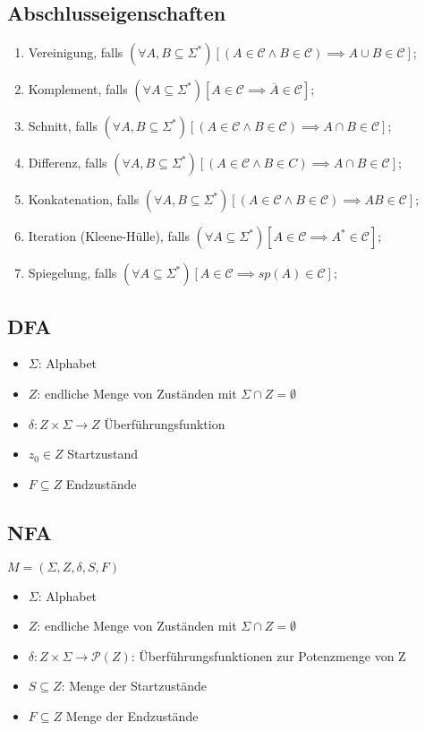 \documentclass[9pt, a4paper]{article}
\begin{document}
\subsection{Abschlusseigenschaften}
\begin{enumerate}
	\item Vereinigung, falls $(\forall A, B \subseteq \Sigma^*)[(A \in \mathcal{C} \wedge B \in \mathcal{ C}) \implies A \cup B \in \mathcal{C}]$;
	\item Komplement, falls $(\forall A \subseteq \Sigma^*)[A \in \mathcal{C} \implies \overline{A}\in\mathcal{C}]$;
	\item Schnitt, falls $(\forall A, B \subseteq \Sigma^*)[(A \in \mathcal{C} \wedge B \in \mathcal{C}) \implies A \cap B \in \mathcal{C}]$;
	\item Differenz, falls $(\forall A, B \subseteq \Sigma^*)[(A \in \mathcal{C} \wedge B \in C) \implies A \cap B \in \mathcal{C}]$;
	\item Konkatenation, falls $(\forall A, B \subseteq \Sigma^*)[(A \in \mathcal{C} \wedge B \in \mathcal{C})\implies AB \in \mathcal{C}]$;
	\item Iteration (Kleene-Hülle), falls $(\forall A \subseteq \Sigma^*)[A\in\mathcal{C}\implies A^*\in\mathcal{C}]$;
	\item Spiegelung, falls $(\forall A\subseteq \Sigma^*)[A\in\mathcal{C}\implies sp(A)\in\mathcal{C}]$;
\end{enumerate}

\subsection{DFA}
\begin{itemize}
	\item $\Sigma$: Alphabet
	\item $Z$: endliche Menge von Zuständen mit $\Sigma \cap Z = \emptyset$
	\item $\delta: Z \times \Sigma \rightarrow Z$ Überführungsfunktion
	\item $z_0 \in Z$ Startzustand
	\item $F \subseteq Z$ Endzustände
\end{itemize}
\subsection{NFA}
$M=(\Sigma, Z, \delta, S, F)$
\begin{itemize}
	\item $\Sigma$: Alphabet
	\item $Z$: endliche Menge von Zuständen mit $\Sigma \cap Z = \emptyset$
	\item $\delta: Z \times \Sigma \rightarrow \mathcal{P}(Z)$: Überführungsfunktionen zur Potenzmenge von Z
	\item $S \subseteq Z$: Menge der Startzustände
	\item $F \subseteq Z$ Menge der Endzustände
\end{itemize}
\end{document}
